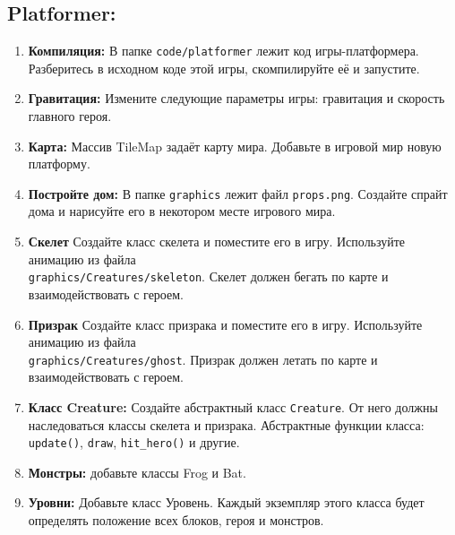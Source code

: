 \documentclass{article}
\begin{document}
\subsection*{Platformer:}
\begin{enumerate}
\item \textbf{Компиляция:} В папке \texttt{code/platformer} лежит код игры-платформера. Разберитесь в исходном коде этой игры, скомпилируйте её и запустите.\\
\item \textbf{Гравитация:} Измените следующие параметры игры: гравитация и скорость главного героя.\\
\item \textbf{Карта:} Массив TileMap задаёт карту мира. Добавьте в игровой мир новую платформу.\\
\item \textbf{Постройте дом:} В папке \texttt{graphics} лежит файл \texttt{props.png}. Создайте спрайт дома и нарисуйте его в некотором месте игрового мира.\\
\item \textbf{Скелет} Создайте класс скелета и поместите его в игру. Используйте анимацию из файла\\ \texttt{graphics/Creatures/skeleton}. Скелет должен бегать по карте и взаимодействовать с героем.
\item \textbf{Призрак} Создайте класс призрака и поместите его в игру. Используйте анимацию из файла\\ \texttt{graphics/Creatures/ghost}. Призрак должен летать по карте и взаимодействовать с героем.
\item \textbf{Класс Creature:} Создайте абстрактный класс \texttt{Creature}. От него должны наследоваться классы скелета и призрака. Абстрактные функции класса: \texttt{update()}, \texttt{draw}, \texttt{hit\_hero()} и другие.
\item \textbf{Монстры:} добавьте классы Frog и Bat.
\item \textbf{Уровни:} Добавьте класс Уровень. Каждый экземпляр этого класса будет определять положение всех блоков, героя и монстров.
\end{enumerate}
\end{document}
